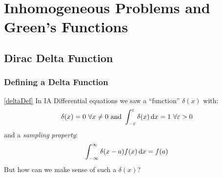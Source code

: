 \documentclass[../main.tex]{subfiles}
\begin{document}
\chapter{Inhomogeneous Problems and Green's Functions}
\section{Dirac Delta Function}
\subsection{Defining a Delta Function} \cref{deltaDef}
In IA Differential equations we saw a ``function'' $\delta(x)$ with:
\[
  \delta(x) = 0\ \forall x \neq 0 \text{ and } \int_{-\varepsilon}^{\varepsilon} \delta(x) \d{x} = 1\ \forall \varepsilon > 0
\]
and a \textit{sampling property}:
\[
  \int_{-\infty}^{\infty} \delta(x - a)f(x) \d{x} = f(a)
\]
But how can we make sense of such a $\delta(x)$?
\end{document}
